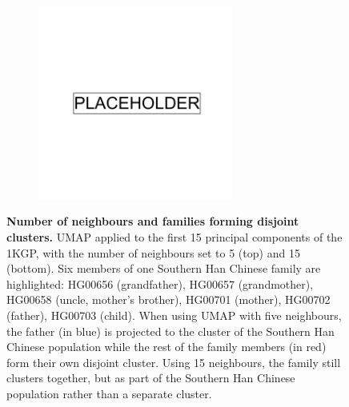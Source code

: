 \begin{figure}[ht]
    \centering
    \begin{subfigure}{\textwidth}
    \includegraphics[width=0.7\textwidth]{placeholder.png}
    \end{subfigure}
    \caption[Number of neighbours and families forming disjoint clusters]{\textbf{Number of neighbours and families forming disjoint clusters.} UMAP applied to the first 15 principal components of the 1KGP, with the number of neighbours set to 5 (top) and 15 (bottom). Six members of one Southern Han Chinese family are highlighted: HG00656 (grandfather), HG00657 (grandmother), HG00658 (uncle, mother's brother), HG00701 (mother), HG00702 (father), HG00703 (child). When using UMAP with five neighbours, the father (in blue) is projected to the cluster of the Southern Han Chinese population while the rest of the family members (in red) form their own disjoint cluster. Using 15 neighbours, the family still clusters together, but as part of the Southern Han Chinese population rather than a separate cluster.}
    \label{fig:supp_1kgp_families}
\end{figure}

\newpage

